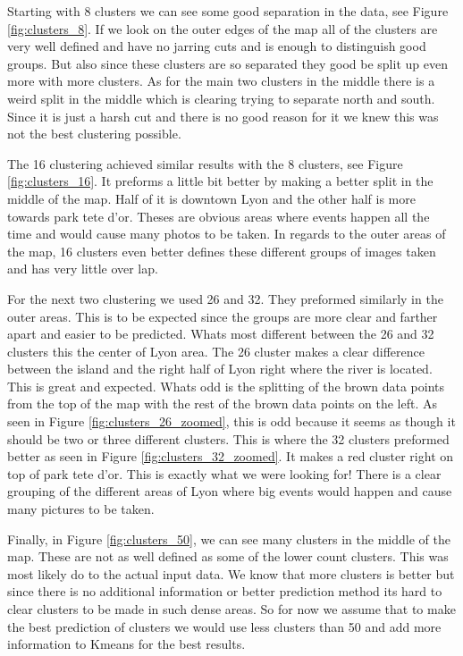 \documentclass{article}
\begin{document}
\par
Starting with 8 clusters we can see some good separation in the data, see Figure \ref{fig:clusters_8}. If we look on the outer edges of the map all of the clusters are very well defined and have no jarring cuts and is enough to distinguish good groups. But also since these clusters are so separated they good be split up even more with more clusters. As for the main two clusters in the middle there is a weird split in the middle which is clearing trying to separate north and south. Since it is just a harsh cut and there is no good reason for it we knew this was not the best clustering possible. 

\par 
The 16 clustering achieved similar results with the 8 clusters, see Figure \ref{fig:clusters_16}. It preforms a little bit better by making a better split in the middle of the map. Half of it is downtown Lyon and the other half is more towards park tete d'or. Theses are obvious areas where events happen all the time and would cause many photos to be taken. In regards to the outer areas of the map, 16 clusters even better defines these different groups of images taken and has very little over lap. 

\par 
For the next two clustering we used 26 and 32. They preformed similarly in the outer areas. This is to be expected since the groups are more clear and farther apart and easier to be predicted. Whats most different between the 26 and 32 clusters this the center of Lyon area. The 26 cluster makes a clear difference between the island and the right half of Lyon right where the river is located. This is great and expected. Whats odd is the splitting of the brown data points from the top of the map with the rest of the brown data points on the left. As seen in Figure \ref{fig:clusters_26_zoomed}, this is odd because it seems as though it should be two or three different clusters. This is where the 32 clusters preformed better as seen in Figure \ref{fig:clusters_32_zoomed}. It makes a red cluster right on top of park tete d'or. This is exactly what we were looking for! There is a clear grouping of the different areas of Lyon where big events would happen and cause many pictures to be taken. 

\par 
Finally, in Figure \ref{fig:clusters_50}, we can see many clusters in the middle of the map. These are not as well defined as some of the lower count clusters. This was most likely do to the actual input data. We know that more clusters is better but since there is no additional information or better prediction method its hard to clear clusters to be made in such dense areas. So for now we assume that to make the best prediction of clusters we would use less clusters than 50 and add more information to Kmeans for the best results. 
\end{document}
